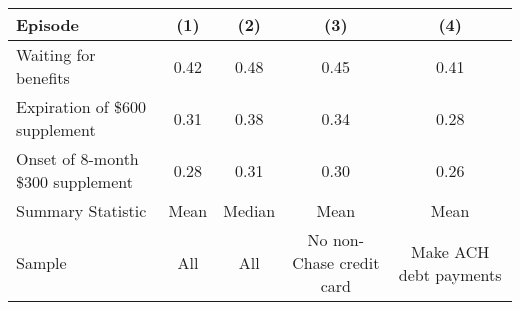 \begin{tabular}{lcccc}
  \toprule \toprule
Episode & (1) & (2) & (3) & (4) \\ 
  \midrule
Waiting for benefits & 0.42 & 0.48 & 0.45 & 0.41 \\ 
  Expiration of \$600 supplement & 0.31 & 0.38 & 0.34 & 0.28 \\ 
  Onset of 8-month \$300 supplement & 0.28 & 0.31 & 0.30 & 0.26 \\ 
Summary Statistic & Mean & Median & Mean & Mean \\
\midrule
Sample & All & All & No non-Chase credit card & Make ACH debt payments \\
   \bottomrule
\end{tabular}
